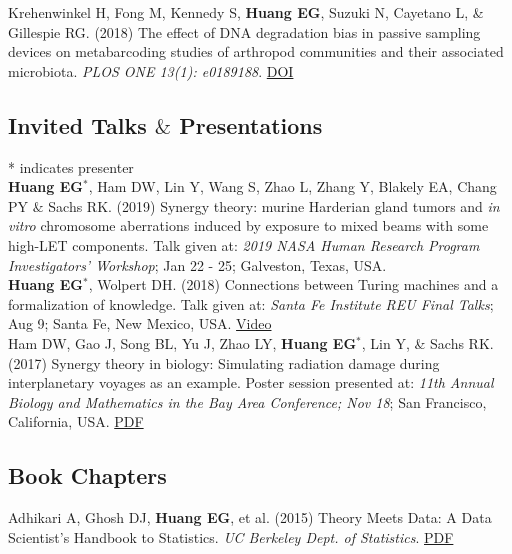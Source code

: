 \documentclass[10pt, letterpaper]{article}
\newcommand{\years}[1]{\marginnote{\scriptsize #1}}
\begin{document}
\years{2018}Krehenwinkel H, Fong M, Kennedy S, \textbf{Huang EG}, Suzuki N, Cayetano L, \& Gillespie RG. (2018) The effect of DNA degradation bias in passive sampling devices on metabarcoding studies of arthropod communities and their associated microbiota. \emph{PLOS ONE 13(1): e0189188}. \href{https://doi.org/10.1371/journal.pone.0189188}{DOI} \\

\subsection*{Invited Talks $\&$ Presentations}
* indicates presenter\\


\noindent
\years{2019}\textbf{Huang EG}$^{*}$, Ham DW, Lin Y, Wang S, Zhao L, Zhang Y, Blakely EA, Chang PY $\&$ Sachs RK. (2019) Synergy theory: murine Harderian gland tumors and \textit{in vitro} chromosome aberrations induced by exposure to mixed beams with some high-LET components. Talk given at: \emph{2019 NASA Human Research Program Investigators' Workshop}; Jan 22 - 25; Galveston, Texas, USA.\\

\years{2018}\textbf{Huang EG}$^{*}$, Wolpert DH. (2018) Connections between Turing machines and a formalization of knowledge. Talk given at: \emph{Santa Fe Institute REU Final Talks}; Aug 9; Santa Fe, New Mexico, USA. \href{https://www.youtube.com/watch?v=10bi_R47uYw&list=PLZlVBTf7N6GpTwEeQOlOmIfYN5J7zciZR&index=6&t=0s}{Video}\\

\years{2017}Ham DW, Gao J, Song BL, Yu J, Zhao LY, \textbf{Huang EG}$^{*}$, Lin Y, \& Sachs RK. (2017) Synergy theory in biology: Simulating radiation damage during interplanetary voyages as an example. Poster session presented at: \emph{11th Annual Biology and Mathematics in the Bay Area Conference; Nov 18}; San Francisco, California, USA. \href{https://nbviewer.jupyter.org/github/sachsURAP/BaMBA_11/blob/master/Bamba17v3.pdf}{PDF}\\

\subsection*{Book Chapters}
\noindent
\years{2015}Adhikari A, Ghosh DJ, \textbf{Huang EG}, et al. (2015) Theory Meets Data: A Data Scientist’s Handbook to Statistics. \emph{UC Berkeley Dept. of Statistics}. {\href{https://nbviewer.jupyter.org/github/eghuang/theory_meets_data/blob/master/theory-meets-data.pdf}{PDF}}\\
\end{document}
